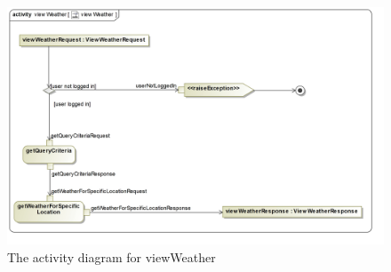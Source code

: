\begin{figure}[H]
	\centering
	\includegraphics[scale=0.2]{../images/funcReq/viewWeatherActivityDiagram.jpg}
	\caption{The activity diagram for viewWeather \label{overflow}}
\end{figure}